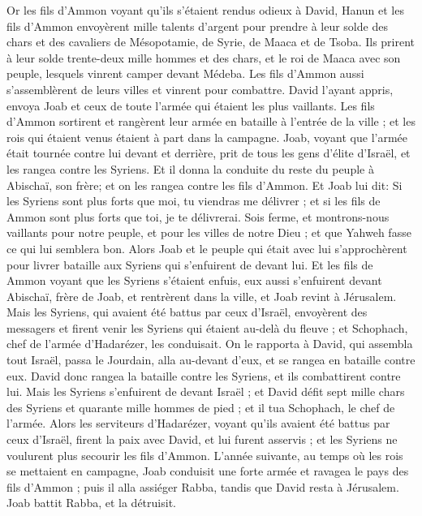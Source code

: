 \begin{multicols}{2}
Or les fils d’Ammon voyant qu'ils s'étaient rendus odieux à David, Hanun et les fils d'Ammon envoyèrent mille talents d'argent pour prendre à leur solde des chars et des cavaliers de Mésopotamie, de Syrie, de Maaca et de Tsoba.
Ils prirent à leur solde trente-deux mille hommes et des chars, et le roi de Maaca avec son peuple, lesquels vinrent camper devant Médeba. Les fils d'Ammon aussi s'assemblèrent de leurs villes et vinrent pour combattre.
David l’ayant appris, envoya Joab et ceux de toute l'armée qui étaient les plus vaillants.
Les fils d’Ammon sortirent et rangèrent leur armée en bataille à l'entrée de la ville ; et les rois qui étaient venus étaient à part dans la campagne.
Joab, voyant que l'armée était tournée contre lui devant et derrière, prit de tous les gens d'élite d'Israël, et les rangea contre les Syriens.
Et il donna la conduite du reste du peuple à Abischaï, son frère; et on les rangea contre les fils d’Ammon.
Et Joab lui dit: Si les Syriens sont plus forts que moi, tu viendras me délivrer ; et si les fils de Ammon sont plus forts que toi, je te délivrerai.
Sois ferme, et montrons-nous vaillants pour notre peuple, et pour les villes de notre Dieu ; et que Yahweh fasse ce qui lui semblera bon.
Alors Joab et le peuple qui était avec lui s'approchèrent pour livrer bataille aux Syriens qui s'enfuirent de devant lui.
Et les fils de Ammon voyant que les Syriens s'étaient enfuis, eux aussi s'enfuirent devant Abischaï, frère de Joab, et rentrèrent dans la ville, et Joab revint à Jérusalem.
Mais les Syriens, qui avaient été battus par ceux d'Israël, envoyèrent des messagers et firent venir les Syriens qui étaient au-delà du fleuve ; et Schophach, chef de l'armée d'Hadarézer, les conduisait.
On le rapporta à David, qui assembla tout Israël, passa le Jourdain, alla au-devant d'eux, et se rangea en bataille contre eux. David donc rangea la bataille contre les Syriens, et ils combattirent contre lui.
Mais les Syriens s'enfuirent de devant Israël ; et David défit sept mille chars des Syriens et quarante mille hommes de pied ; et il tua Schophach, le chef de l'armée.
Alors les serviteurs d'Hadarézer, voyant qu'ils avaient été battus par ceux d'Israël, firent la paix avec David, et lui furent asservis ; et les Syriens ne voulurent plus secourir les fils d’Ammon.
\VerseOne{}L’année suivante, au temps où les rois se mettaient en campagne, Joab conduisit une forte armée et ravagea le pays des fils d’Ammon ; puis il alla assiéger Rabba, tandis que David resta à Jérusalem. Joab battit Rabba, et la détruisit.

\end{multicols}
